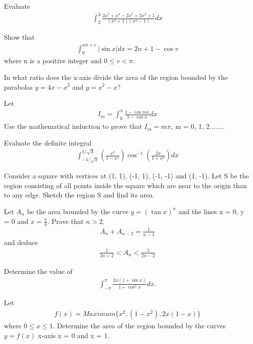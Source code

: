 \item Evaluate
\begin{align*}
\int_{2}^{3}\frac{2x^5 + x^4 - 2x^3 + 2x^2 + 1}{(x^2 + 1)(x^4 - 1)}dx
\end{align*}

\item Show that
\begin{align*}
\int_{0}^{n\pi + v}|\sin x|dx = 2n + 1 - \cos v
\end{align*}
where n is a positive integer and $0 \leq v < \pi$.

\item In what ratio does the x-axis divide the area of the region bounded by the parabolas $y = 4x - x^2$ and $y = x^2 - x$?

\item Let
\begin{align*}
I_m = \int_{0}^{\pi}\frac{1 - \cos mx}{1 - \cos x}dx
\end{align*}
Use the mathematical induction to prove that $I_m = m\pi$, m = 0, 1, 2........

\item Evaluate the definite integral
\begin{align*}
\int_{-1/\sqrt{3}}^{1/\sqrt{3}}\left(\frac{x^4}{1 - x^4}\right)\cos^{-1}\left(\frac{2x}{1 + x^2}\right) dx
\end{align*}

\item Consider a square with vertices at (1, 1), (-1, 1), (-1, -1) and (1, -1). Let S be the region consisting of all points inside the square which are near to the origin than to any edge. Sketch the region S and find its area.

\item Let $A_n$ be the area bounded by the curve $y = (\tan x)^n$ and the lines x = 0, y = 0 and $x = \frac{\pi}{4}$. Prove that $n > 2$,
\begin{align*}
A_n + A_{n-2} = \frac{1}{n - 1}
\end{align*}
and deduce
\begin{align*}
\frac{1}{2n + 2} < A_n < \frac{1}{2n - 2}
\end{align*}

\item Determine the value of
\begin{align*}
\int_{-\pi}^{\pi}\frac{2x(1 + \sin x)}{1 + \cos^{2}x}dx.
\end{align*}

\item Let 
\begin{align*}
f(x) = Maximum\{x^2, (1 - x^2), 2x(1 - x)\}
\end{align*}
where $0 \leq x \leq 1$. Determine the area of the region bounded by the curves $y = f(x)$ x-axis x = 0 and x = 1.

